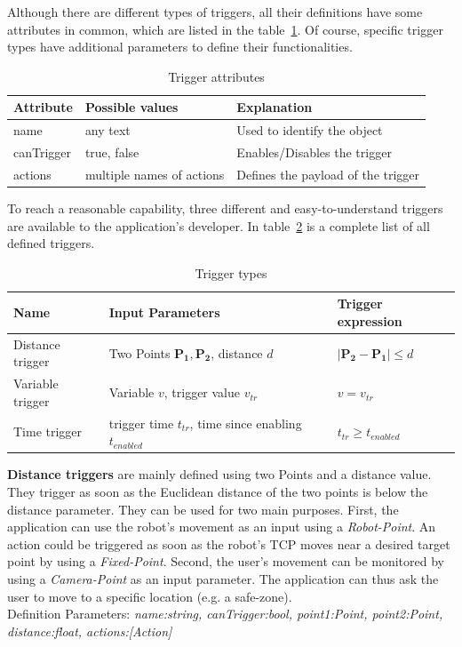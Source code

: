 Although there are different types of triggers, all their definitions have some attributes in common, which are listed in the table~\ref{Table:TriggerAttributes}. Of course, specific trigger types have additional parameters to define their functionalities.

 \begin{table}[!h]
 	\caption{Trigger attributes}
 	\label{Table:TriggerAttributes}
 	\centering
 	\begin{tabular}{lll}
 		\toprule
 		Attribute & Possible values		& Explanation	\\		
 		\midrule
 		name & any text & Used to identify the object \\
 		canTrigger & true, false		& Enables/Disables the trigger \\
 		actions & multiple names of actions & Defines the payload of the trigger \\
 		\bottomrule
 	\end{tabular}
 \end{table}

To reach a reasonable capability, three different and easy-to-understand triggers are available to the application's developer. In table~\ref{Table:Triggers} is a complete list of all defined triggers.

 
 \begin{table}
 	\caption{Trigger types}
 	\label{Table:Triggers}
 	\centering
 	\begin{tabular}{lll}
 		\toprule
 		Name & Input Parameters		& Trigger expression	\\		
 		\midrule
 		Distance trigger & Two Points $\boldsymbol{P_1}, \boldsymbol{P_2}$, distance $d$		&  $|\boldsymbol{P_2}-\boldsymbol{P_1}| \le d$ \\
		Variable trigger & Variable $v$, trigger value $v_{tr}$ 		& $v = v_{tr}$	 \\
		Time trigger & trigger time $t_{tr}$, time since enabling $t_{enabled}$ & $t_{tr} \geq t_{enabled}$\\
		\bottomrule
	\end{tabular}
\end{table}

\textbf{Distance triggers} are mainly defined using two Points and a distance value. They trigger as soon as the Euclidean distance of the two points is below the distance parameter. They can be used for two main purposes. First, the application can use the robot's movement as an input using a \textit{Robot-Point}. An action could be triggered as soon as the robot's TCP moves near a desired target point by using a \textit{Fixed-Point}. Second, the user's movement can be monitored by using a \textit{Camera-Point} as an input parameter. The application can thus ask the user to move to a specific location (e.g. a safe-zone).\\Definition Parameters: \textit{name:string, canTrigger:bool, point1:Point, point2:Point, distance:float, actions:[Action] }

